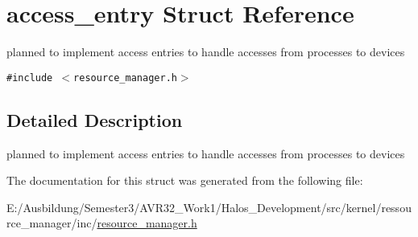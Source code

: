 \hypertarget{structaccess__entry}{
\section{access\_\-entry Struct Reference}
\label{structaccess__entry}
}
planned to implement access entries to handle accesses from processes to devices  


{\tt \#include $<$resource\_\-manager.h$>$}



\subsection{Detailed Description}
planned to implement access entries to handle accesses from processes to devices 

The documentation for this struct was generated from the following file:\begin{CompactItemize}
\item 
E:/Ausbildung/Semester3/AVR32\_\-Work1/Halos\_\-Development/src/kernel/ressource\_\-manager/inc/\hyperlink{resource__manager_8h}{resource\_\-manager.h}\end{CompactItemize}
